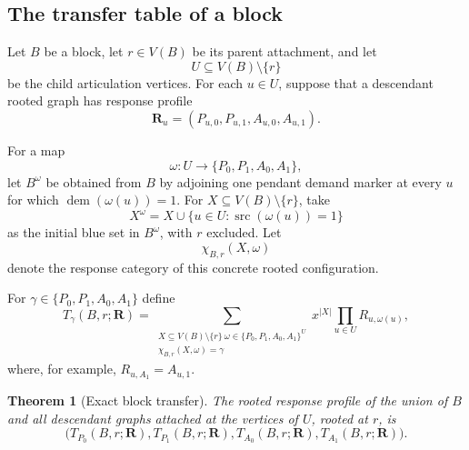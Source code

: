 \documentclass[11pt,reqno]{amsart}
\newtheorem{theorem}{Theorem}[section]
\theoremstyle{definition}
\begin{document}
\subsection{The transfer table of a block}

Let $B$ be a block, let $r\in V(B)$ be its parent attachment, and let
\[
  U\subseteq V(B)\setminus\{r\}
\]
be the child articulation vertices.  For each $u\in U$, suppose that a descendant rooted graph has response profile
\[
  \mathbf R_u=(P_{u,0},P_{u,1},A_{u,0},A_{u,1}).
\]

For a map
\[
  \omega:U\longrightarrow\{P_0,P_1,A_0,A_1\},
\]
let $B^\omega$ be obtained from $B$ by adjoining one pendant demand marker at every $u$ for which $\operatorname{dem}(\omega(u))=1$.  For $X\subseteq V(B)\setminus\{r\}$, take
\[
  X^\omega=X\cup
  \{u\in U:\operatorname{src}(\omega(u))=1\}
\]
as the initial blue set in $B^\omega$, with $r$ excluded.  Let
\[
  \chi_{B,r}(X,\omega)
\]
denote the response category of this concrete rooted configuration.

For $\gamma\in\{P_0,P_1,A_0,A_1\}$ define
\begin{equation}\label{eq:block-transfer}
  T_\gamma(B,r;\mathbf R)
  =
  \sum_{\substack{X\subseteq V(B)\setminus\{r\}\
                   \omega\in\{P_0,P_1,A_0,A_1\}^{U}\\
                   \chi_{B,r}(X,\omega)=\gamma}}
  x^{|X|}
  \prod_{u\in U} R_{u,\omega(u)},
\end{equation}
where, for example, $R_{u,A_1}=A_{u,1}$.

\begin{theorem}[Exact block transfer]\label{thm:block-transfer}
The rooted response profile of the union of $B$ and all descendant graphs attached at the vertices of $U$, rooted at $r$, is
\[
  \boxed{
  \bigl(
    T_{P_0}(B,r;\mathbf R),
    T_{P_1}(B,r;\mathbf R),
    T_{A_0}(B,r;\mathbf R),
    T_{A_1}(B,r;\mathbf R)
  \bigr).
  }
\]
\end{theorem}
\end{document}
